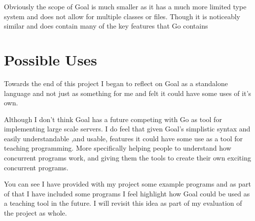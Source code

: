 Obviously the scope of Goal is much smaller as it has a much more limited type system and does not allow for multiple classes or files. Though it is noticeably similar and does contain many of the key features that Go contains 

\section{Possible Uses}

Towards the end of this project I began to reflect on Goal as a standalone language and not just as something for me and felt it could have some uses of it's own.

Although I don't think Goal has a future competing with Go as tool for implementing large scale servers. I do feel that given Goal's simplistic syntax and easily understandable ,and usable, features it could have some use as a tool for teaching programming. More specifically helping people to understand how concurrent programs work, and giving them the tools to create their own exciting concurrent programs.

You can see I have provided with my project some example programs and as part of that I have included some programs I feel highlight how Goal could be used as a teaching tool in the future. I will revisit this idea as part of my evaluation of the project as whole.    
